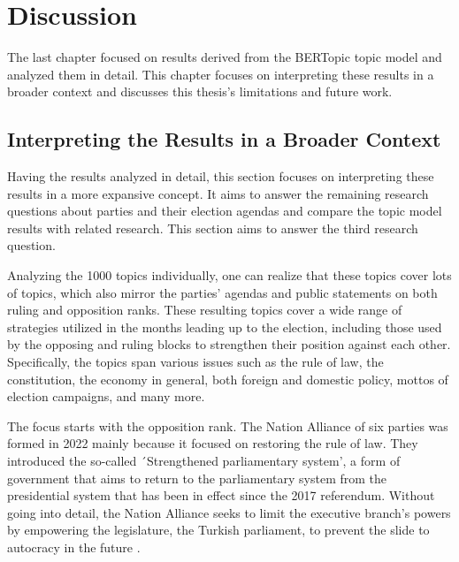 
\chapter{Discussion}\label{chapter:discussion}

The last chapter focused on results derived from the BERTopic topic model and analyzed them in 
detail. This chapter focuses on interpreting these results in a broader context and discusses this
thesis's limitations and future work. 

\section{Interpreting the Results in a Broader Context}

Having the results analyzed in detail, this section focuses on interpreting these results in a more 
expansive concept. It aims to answer the remaining research questions about parties and their election 
agendas and compare the topic model results with related research. This section aims to answer the third 
research question.

Analyzing the 1000 topics individually, one can realize that these topics cover lots of topics, 
which also mirror the parties' agendas and public statements on both ruling and opposition ranks. 
These resulting topics cover a wide range of strategies utilized in the months leading up to the 
election, including those used by the opposing and ruling blocks to strengthen their position against each 
other. Specifically, the topics span various issues such as the rule of law, the constitution, the 
economy in general, both foreign and domestic policy, mottos of election campaigns, and many more.

The focus starts with the opposition rank. The Nation Alliance of six parties was formed in 
2022 mainly because it focused on restoring the rule of law. They introduced the so-called 
´Strengthened parliamentary system', a form of government that aims to return to the parliamentary system 
from the presidential system that has been in effect since the 2017 referendum. Without going into detail, 
the Nation Alliance seeks to limit the executive branch's powers by empowering the legislature, the 
Turkish parliament, to prevent the slide to autocracy in the future \parencite{edgar_sar_opposition_election_agenda_2023}.

